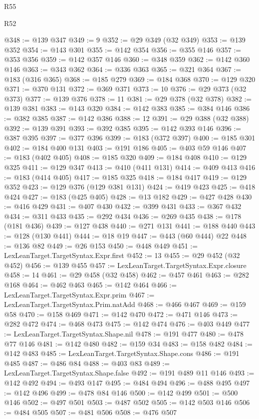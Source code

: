 \begin{lexlean}{R55}
\begin{lexlean}{R52}
\begin{coremodule}
{{{{{{{{{{{{{{{{{{{{{{{{{{{{{{{{{{{{{{{{{{{{{{{{{{{{{{{{{{{{{{{{{{{{{{{{{{{{{{{{{{{{{{{{{{{{{{{{{{{{{{{{{{{{{{{{{{{{{{{{{{{{{{{{{{{{{{{{{{{{{{{{{{{{{{{{{{{{{{{{{{{{{{{{{{{{{{{{{{{{{{{{{{{{{{{{{{{{{{@348 := @139 @347
@349 := 9
@352 := @29 @349 (@32 @349)
@353 := @139 @352
@354 := @143 @301
@355 := @142 @354
@356 := @355 @146
@357 := @353 @356
@359 := @142 @357 @146
@360 := @348 @359
@362 := @142 @360 @146
@363 := @343 @362
@364 := @336 @363
@365 := @321 @364
@367 := @183 (@316 @365)
@368 := @185 @279
@369 := @184 @368
@370 := @129 @320
@371 := @370 @131
@372 := @369 @371
@373 := 10
@376 := @29 @373 (@32 @373)
@377 := @139 @376
@378 := 11
@381 := @29 @378 (@32 @378)
@382 := @139 @381
@383 := @143 @320
@384 := @142 @383
@385 := @384 @146
@386 := @382 @385
@387 := @142 @386
@388 := 12
@391 := @29 @388 (@32 @388)
@392 := @139 @391
@393 := @392 @385
@395 := @142 @393 @146
@396 := @387 @395
@397 := @377 @396
@399 := @183 (@372 @397)
@400 := @185 @301
@402 := @184 @400 @131
@403 := @191 @186
@405 := @403 @59 @146
@407 := @183 (@402 @405)
@408 := @185 @320
@409 := @184 @408
@410 := @129 @325
@411 := @129 @347
@413 := @410 (@411 @131)
@414 := @409 @413
@416 := @183 (@414 @405)
@417 := @185 @325
@418 := @184 @417
@419 := @129 @352
@423 := @129 @376 (@129 @381 @131)
@424 := @419 @423
@425 := @418 @424
@427 := @183 (@425 @405)
@428 := @13 @182
@429 := @427 @428
@430 := @416 @429
@431 := @407 @430
@432 := @399 @431
@433 := @367 @432
@434 := @311 @433
@435 := @292 @434
@436 := @269 @435
@438 := @178 (@181 @436)
@439 := @127 @438
@440 := @271 @131
@441 := @188 @440
@443 := @128 (@130 @441)
@444 := @18 @19
@447 := @443 (@60 @444) @22
@448 := @136 @82
@449 := @26 @153
@450 := @448 @449
@451 := LexLeanTarget.TargetSyntax.Expr.first
@452 := 13
@455 := @29 @452 (@32 @452)
@456 := @139 @455
@457 := LexLeanTarget.TargetSyntax.Expr.closure
@458 := 14
@461 := @29 @458 (@32 @458)
@462 := @457 @461
@463 := @282 @168
@464 := @462 @463
@465 := @142 @464
@466 := LexLeanTarget.TargetSyntax.Expr.prim
@467 := LexLeanTarget.TargetSyntax.Prim.natAdd
@468 := @466 @467
@469 := @159 @58
@470 := @158 @469
@471 := @142 @470
@472 := @471 @146
@473 := @282 @472
@474 := @468 @473
@475 := @142 @474
@476 := @403 @449
@477 := LexLeanTarget.TargetSyntax.Shape.nil
@478 := @191 @477
@480 := @478 @77 @146
@481 := @142 @480
@482 := @159 @34
@483 := @158 @482
@484 := @142 @483
@485 := LexLeanTarget.TargetSyntax.Shape.cons
@486 := @191 @485
@487 := @486 @84
@488 := @403 @83
@489 := LexLeanTarget.TargetSyntax.Shape.false
@492 := @191 @489 @11 @146
@493 := @142 @492
@494 := @493 @147
@495 := @484 @494
@496 := @488 @495
@497 := @142 @496
@499 := @478 @84 @146
@500 := @142 @499
@501 := @500 @146
@502 := @497 @501
@503 := @487 @502
@505 := @142 @503 @146
@506 := @484 @505
@507 := @481 @506
@508 := @476 @507
}}}}}}}}}}}}}}}}}}}}}}}}}}}}}}}}}}}}}}}}}}}}}}}}}}}}}}}}}}}}}}}}}}}}}}}}}}}}}}}}}}}}}}}}}}}}}}}}}}}}}}}}}}}}}}}}}}}}}}}}}}}}}}}}}}}}}}}}}}}}}}}}}}}}}}}}}}}}}}}}}}}}}}}}}}}}}}}}}}}}}}}}}}}}}}}}}}}}}}
\end{coremodule}
\end{lexlean}
\end{lexlean}
